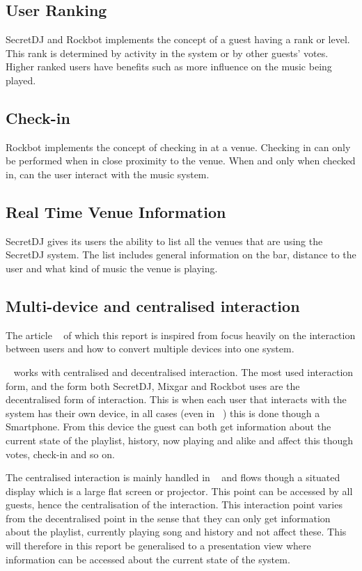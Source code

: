 \subsection{User Ranking}
SecretDJ and Rockbot implements the concept of a guest having a rank or
level. This rank is determined by activity in the system or by other
guests' votes. Higher ranked users have benefits such as more influence on the music being played.

\subsection{Check-in}
Rockbot implements the concept of checking in at a venue. Checking in
can only be performed when in close proximity to the venue. When and
only when checked in, can the user interact with the music system.

\subsection{Real Time Venue Information}
SecretDJ gives its users the ability to list all the venues that are
using the SecretDJ system. The list includes general information on
the bar, distance to the user and what kind of music the venue is
playing.

\subsection{Multi-device and centralised interaction}
The article ~\cite{sorensen2012} of which this report is inspired from focus heavily on the interaction between users and how to convert multiple devices into one system.

~\cite{sorensen2012} works with centralised and decentralised interaction. The most used interaction form, and the form both SecretDJ, Mixgar and Rockbot uses are the decentralised form of interaction. This is when each user that interacts with the system has their own device, in all cases (even in ~\cite{sorensen2012}) this is done though a Smartphone. From this device the guest can both get information about the current state of the playlist, history, now playing and alike and affect this though votes, check-in and so on.

The centralised interaction is mainly handled in ~\cite{sorensen2012} and flows though a situated display which is a large flat screen or projector. This point can be accessed by all guests, hence the centralisation of the interaction. This interaction point varies from the decentralised point in the sense that they can only get information about the playlist, currently playing song and history and not affect these. This will therefore in this report be generalised to a presentation view where information can be accessed about the current state of the system.
